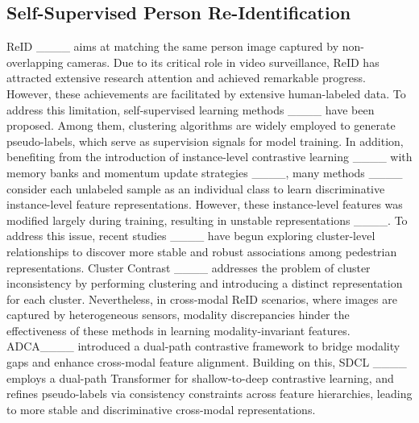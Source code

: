 \subsection{Self-Supervised Person Re-Identification}
ReID ____ aims at matching the same person image captured by non-overlapping cameras. Due to its critical role in video surveillance, ReID has attracted extensive research attention and achieved remarkable progress. However, these achievements are facilitated by extensive human-labeled data. To address this limitation, self-supervised learning methods ____ have been proposed. Among them, clustering algorithms are widely employed to generate pseudo-labels, which serve as supervision signals for model training. In addition, benefiting from the introduction of instance-level contrastive learning ____ with memory banks and momentum update strategies ____, many methods ____ consider each unlabeled sample as an individual class to learn discriminative instance-level feature representations. However, these instance-level features was modified largely during training, resulting in unstable representations ____. To address this issue, recent studies ____ have begun exploring cluster-level relationships to discover more stable and robust associations among pedestrian representations. Cluster Contrast ____ addresses the problem of cluster inconsistency by performing clustering and introducing a distinct representation for each cluster. Nevertheless, in cross-modal ReID scenarios, where images are captured by heterogeneous sensors, modality discrepancies hinder the effectiveness of these methods in learning modality-invariant features. ADCA____ introduced a dual-path contrastive framework to bridge modality gaps and enhance cross-modal feature alignment. Building on this, SDCL ____ employs a dual-path Transformer for shallow-to-deep contrastive learning, and refines pseudo-labels via consistency constraints across feature hierarchies, leading to more stable and discriminative cross-modal representations.

